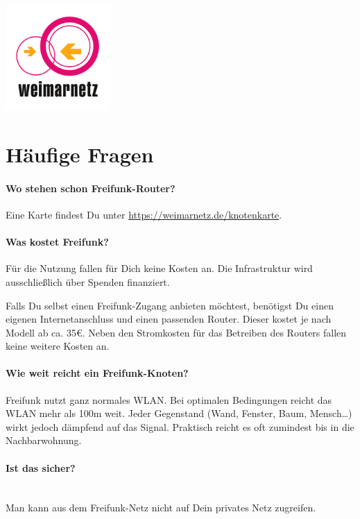 \documentclass[10pt,a4paper,notumble]{leaflet}
\begin{document}
\newpage


\vspace{1em}

\begin{center}
\includegraphics[width=40mm]{weimarnetz_logo.png}
\end{center}

\newpage
\section{Häufige Fragen}
\setlength{\parskip}{0.1em}
\paragraph{Wo stehen schon Freifunk-Router?}
Eine Karte findest Du unter \href{https://weimarnetz.de/knotenkarte}{https://weimarnetz.de/knotenkarte}.

\paragraph{Was kostet Freifunk?}
Für die Nutzung fallen für Dich keine Kosten an. Die Infrastruktur wird ausschließlich über Spenden finanziert.

Falls Du selbst einen Freifunk-Zugang anbieten möchtest, benötigst Du einen eigenen Internetanschluss und einen passenden Router. Dieser kostet je nach Modell ab ca. 35€.  Neben den Stromkosten für das Betreiben des Routers fallen keine weitere Kosten an.

\paragraph{Wie weit reicht ein Freifunk-Knoten?}
Freifunk nutzt ganz normales WLAN. Bei optimalen Bedingungen reicht das WLAN mehr als 100m weit. Jeder Gegenstand (Wand, Fenster, Baum, Mensch…) wirkt jedoch dämpfend auf das Signal. Praktisch reicht es oft zumindest bis in die Nachbarwohnung.

\paragraph{Ist das sicher?} \\
Man kann aus dem Freifunk-Netz nicht auf Dein privates Netz zugreifen.
\end{document}
